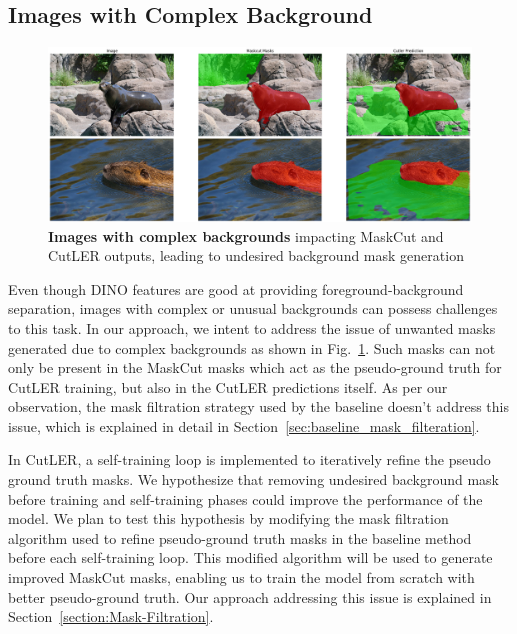 \subsection{Images with Complex Background}
\begin{figure}
	\centering
	\includegraphics[width=1\textwidth]{Images/main/cutler-prob-noisy-bg.png}
	\caption[\textbf{Cutler's Performance on Images with Complex Background}]{\textbf{Images with complex backgrounds} impacting MaskCut and CutLER outputs, leading to undesired background mask generation}
	\label{fig:cutler_noisy_bg_eg}
\end{figure}

Even though DINO features are good at providing foreground-background separation, images with complex or unusual backgrounds can possess challenges to this task. In our approach, we intent to address the issue of unwanted masks generated due to complex backgrounds as shown in Fig.~\ref{fig:cutler_noisy_bg_eg}. Such masks can not only be present in the MaskCut masks which act as the pseudo-ground truth for CutLER training, but also in the CutLER predictions itself. As per our observation, the mask filtration strategy used by the baseline doesn't address this issue, which is explained in detail in Section~\ref{sec:baseline_mask_filteration}.

In CutLER, a self-training loop is implemented to iteratively refine the pseudo ground truth masks. We hypothesize that removing undesired background mask before training and self-training phases could improve the performance of the model. We plan to test this hypothesis by modifying the mask filtration algorithm used to refine pseudo-ground truth masks in the baseline method before each self-training loop. This modified algorithm will be used to generate improved MaskCut masks, enabling us to train the model from scratch with better pseudo-ground truth. Our approach addressing this issue is explained in Section~\ref{section:Mask-Filtration}.

